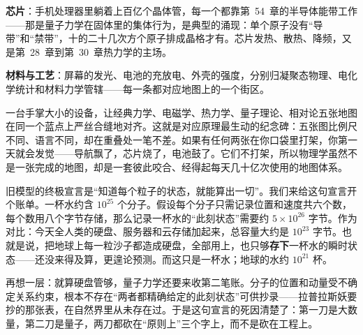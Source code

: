 \textbf{芯片}：手机处理器里躺着上百亿个晶体管，每一个都靠第~54~章的半导体能带工作——那是量子力学在固体里的集体行为，是典型的涌现：单个原子没有“导带”和“禁带”，十的二十几次方个原子排成晶格才有。芯片发热、散热、降频，又是第~28~章到第~30~章热力学的主场。

\textbf{材料与工艺}：屏幕的发光、电池的充放电、外壳的强度，分别归凝聚态物理、电化学统计和材料力学管辖——每一条都对应地图上的一个街区。

一台手掌大小的设备，让经典力学、电磁学、热力学、量子理论、相对论五张地图在同一个蓝点上严丝合缝地对齐。这就是对应原理最生动的纪念碑：五张图比例尺不同、语言不同，却在重叠处一笔不差。如果有任何两张在你口袋里打架，你第一天就会发觉——导航飘了，芯片烧了，电池鼓了。它们不打架，所以物理学虽然不是一张完成的地图，却是一套彼此咬合、经得起每天几十亿次使用的地图体系。


\begin{thought}[拉普拉斯妖需要多大的硬盘]
旧模型的终极宣言是“知道每个粒子的状态，就能算出一切”。我们来给这句宣言开个账单。一杯水约含 $10^{25}$ 个分子。假设每个分子只需记录位置和速度共六个数，每个数用八个字节存储，那么记录一杯水的“此刻状态”需要约 $5\times10^{26}$ 字节。作为对比：今天全人类的硬盘、服务器和云存储加起来，总容量大约是 $10^{23}$ 字节。也就是说，把地球上每一粒沙子都造成硬盘，全部用上，也只够\textbf{存下}一杯水的瞬时状态——还没来得及算，更遑论预测。而这只是一杯水；地球的水约 $10^{21}$ 杯。

再想一层：就算硬盘管够，量子力学还要来收第二笔账。分子的位置和动量受不确定关系约束，根本不存在“两者都精确给定的此刻状态”可供抄录——拉普拉斯妖要抄的那张表，在自然界里从未存在过。于是这句宣言的死因清楚了：第一刀是大数量，第二刀是量子，两刀都砍在“原则上”三个字上，而不是砍在工程上。
\end{thought}

